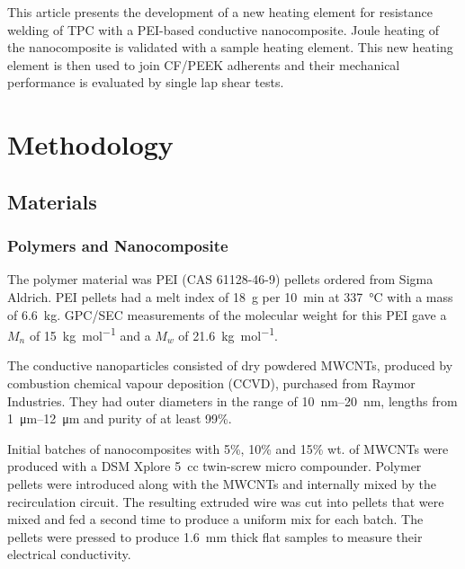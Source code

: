 \documentclass[11pt,review,times]{elsarticle}
\begin{document}
This article presents the development of a new heating element for resistance welding of TPC with a PEI-based conductive nanocomposite. 
Joule heating of the nanocomposite is validated with a sample heating element. 
This new heating element is then used to join CF/PEEK adherents and their mechanical performance is evaluated by single lap shear tests. 

							\section{Methodology}

\subsection{Materials}

\subsubsection{Polymers and Nanocomposite}

The polymer material was PEI (CAS 61128-46-9) pellets ordered from Sigma Aldrich. 
PEI pellets had a melt index of \SI{18}{\gram} per \SI{10}{\minute} at \SI{337}{\celsius} with a mass of \SI{6.6}{\kilogram}. 
GPC/SEC measurements of the molecular weight for this PEI gave a $M_n$ of \SI{15}{\kg\per\mol} and a $M_w$ of \SI{21.6}{\kg\per\mol}. 

The conductive nanoparticles consisted of dry powdered MWCNTs, produced by combustion chemical vapour deposition (CCVD), purchased from Raymor Industries. 
They had outer diameters in the range of \SIrange{10}{20}{\nano\metre}, lengths from \SIrange{1}{12}{\micro\metre} and purity of at least 99\%.

Initial batches of nanocomposites with 5\%, 10\% and 15\% wt. of MWCNTs were produced with a DSM Xplore 5~cc twin-screw micro compounder. 
Polymer pellets were introduced along with the MWCNTs and internally mixed by the recirculation circuit.
The resulting extruded wire was cut into pellets that were mixed and fed a second time to produce a uniform mix for each batch. 
The pellets were pressed to produce \SI{1.6}{\mm} thick flat samples to measure their electrical conductivity.  
\end{document}
